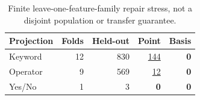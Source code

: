 \begin{table}[t]
\centering
\caption{Finite leave-one-feature-family repair stress, not a disjoint population or transfer guarantee.}
\label{tab:feature-holdout-repair}
\footnotesize
\setlength{\tabcolsep}{3pt}
\begin{tabular}{@{}lrrrr@{}}
\toprule
Projection & Folds & Held-out & Point & Basis \\
\midrule
Keyword & 12 & 830 & \underline{144} & \textbf{0} \\
Operator & 9 & 569 & \underline{12} & \textbf{0} \\
Yes/No & 1 & 3 & \textbf{0} & \textbf{0} \\
\bottomrule
\end{tabular}
\end{table}
